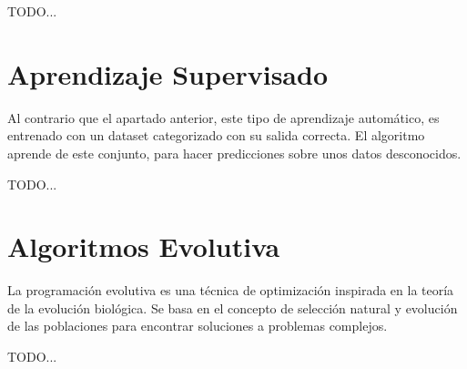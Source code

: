 		TODO...
	
	\newpage %
	\section{Aprendizaje Supervisado}
		Al contrario que el apartado anterior, este tipo de aprendizaje automático, es entrenado con un dataset categorizado con su salida correcta. El algoritmo aprende de este conjunto, para hacer predicciones sobre unos datos desconocidos.
		
		
		TODO...
			
	\newpage %
	\section{Algoritmos Evolutiva}
		La programación evolutiva es una técnica de optimización inspirada en la teoría de la evolución biológica. Se basa en el concepto de selección natural y evolución de las poblaciones para encontrar soluciones a problemas complejos. 
		
	
		TODO...
	
	